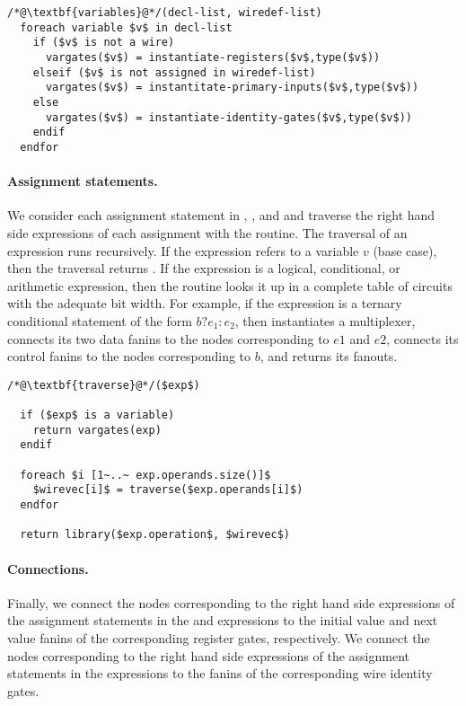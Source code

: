 \begin{lstlisting}
/*@\textbf{variables}@*/(decl-list, wiredef-list)
  foreach variable $v$ in decl-list
    if ($v$ is not a wire) 
      vargates($v$) = instantiate-registers($v$,type($v$))
    elseif ($v$ is not assigned in wiredef-list) 
      vargates($v$) = instantitate-primary-inputs($v$,type($v$))
    else 
      vargates($v$) = instantiate-identity-gates($v$,type($v$))
    endif
  endfor
\end{lstlisting}


\paragraph{Assignment statements.}
We consider each assignment statement in , ,
and  and traverse the right hand side expressions of
each assignment with the  routine. 
The traversal of an expression runs recursively. 
%
If the expression refers to a variable $v$ (base case), 
then the traversal returns . 
%
If the expression is a logical, conditional, or arithmetic expression, then
the  routine looks it up in a complete table of circuits
with the adequate bit width. 
For example, if the expression is a ternary conditional statement of the
form $b? e_1 : e_2$, then  instantiates a multiplexer, 
connects its two data fanins to the nodes corresponding to $e1$ and $e2$, 
connects its control fanins to the nodes corresponding to $b$,
and returns its fanouts. 

\begin{lstlisting}
/*@\textbf{traverse}@*/($exp$)

  if ($exp$ is a variable) 
    return vargates(exp)
  endif

  foreach $i [1~..~ exp.operands.size()]$ 
    $wirevec[i]$ = traverse($exp.operands[i]$) 
  endfor

  return library($exp.operation$, $wirevec$)
\end{lstlisting}

\paragraph{Connections.}
Finally, we connect the nodes corresponding to the right hand side expressions 
of the assignment statements in the  and 
expressions 
to the initial value and next value fanins of the corresponding register gates, 
respectively. 
%
We connect the nodes corresponding to the right hand side expressions
of the assignment statements in the  expressions to the 
fanins of the corresponding wire identity gates. 



